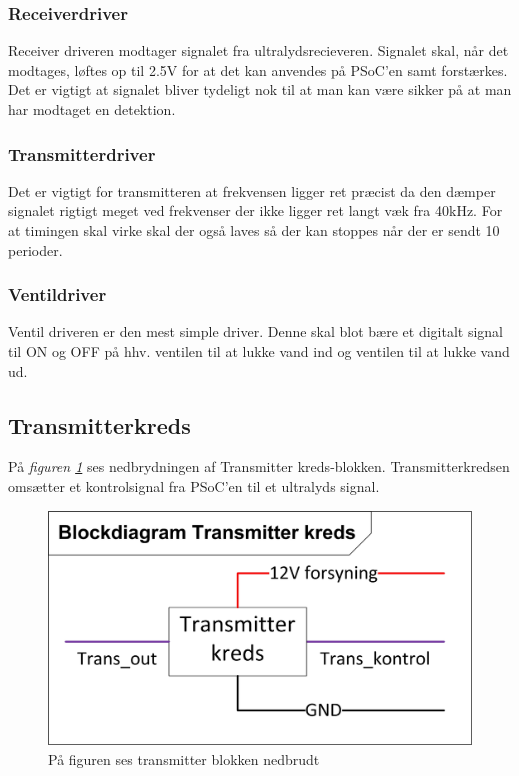 \subsubsection{Receiverdriver}
Receiver driveren modtager signalet fra ultralydsrecieveren. Signalet skal, når det modtages, løftes op til 2.5V for at det kan anvendes på PSoC'en samt forstærkes. Det er vigtigt at signalet bliver tydeligt nok til at man kan være sikker på at man har modtaget en detektion. 
\subsubsection{Transmitterdriver}
Det er vigtigt for transmitteren at frekvensen ligger ret præcist da den dæmper signalet rigtigt meget ved frekvenser der ikke ligger ret langt væk fra 40kHz. For at timingen skal virke skal der også laves så der kan stoppes når der er sendt 10 perioder.
\subsubsection{Ventildriver}
Ventil driveren er den mest simple driver. Denne skal blot bære et digitalt signal til ON og OFF på hhv. ventilen til at lukke vand ind og ventilen til at lukke vand ud.

\subsection{Transmitterkreds}
På \textit{figuren \ref{fig:transmitterblok}} ses nedbrydningen af Transmitter kreds-blokken. Transmitterkredsen omsætter et kontrolsignal fra PSoC'en til et ultralyds signal.
\begin{figure}[H]
\centering
\includegraphics[scale=1]{billeder/transmitterblok}
\caption{På figuren ses transmitter blokken nedbrudt}
\label{fig:transmitterblok}
\end{figure}
